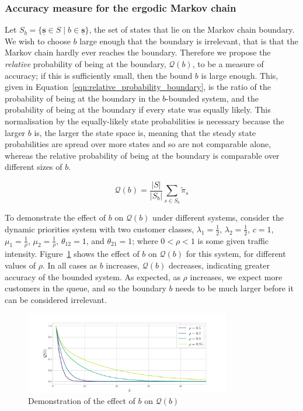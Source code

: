 \documentclass{article}
\begin{document}
\subsubsection{Accuracy measure for the ergodic Markov chain}\label{sec:ergodic_accuracy}
Let $S_b = \{\underline{\mathbf{s}} \in S \;|\; b \in \underline{\mathbf{s}}\}$,
the set of states that lie on the Markov chain boundary. We wish to choose $b$
large enough that the boundary is irrelevant, that is that the Markov chain
hardly ever reaches the boundary. Therefore we propose the \textit{relative}
probability of being at the boundary, $\mathcal{Q}(b)$, to be a measure of
accuracy; if this is sufficiently small, then the bound $b$ is large enough.
This, given in Equation~\ref{eqn:relative_probability_boundary}, is the ratio of
the probability of being at the boundary in the $b$-bounded system, and the
probability of being at the boundary if every state was equally likely. This
normalisation by the equally-likely state probabilities is necessary because the
larger $b$ is, the larger the state space is, meaning that the steady state
probabilities are spread over more states and so are not comparable alone,
whereas the relative probability of being at the boundary is comparable over
different sizes of $b$.

\begin{equation}\label{eqn:relative_probability_boundary}
\mathcal{Q}(b) = \frac{|S|}{|S_b|} \sum_{s \in S_b} \tilde{\pi}_s
\end{equation}

To demonstrate the effect of $b$ on $\mathcal{Q}(b)$ under different systems,
consider the dynamic priorities system with two customer classes,
$\lambda_1 = \frac{1}{2}$, $\lambda_2 = \frac{1}{2}$, $c = 1$,
$\mu_1 = \frac{1}{\rho}$, $\mu_2 = \frac{1}{\rho}$, $\theta_{12} = 1$, and
$\theta_{21} = 1$; where $0 < \rho < 1$ is some given traffic intensity.
Figure~\ref{fig:ergodic_accuracy} shows the effect of $b$ on $\mathcal{Q}(b)$
for this system, for different values of $\rho$. In all cases as $b$ increases,
$\mathcal{Q}(b)$ decreases, indicating greater accuracy of the bounded system.
As expected, as $\rho$ increases, we expect more customers in the queue, and so
the boundary $b$ needs to be much larger before it can be considered irrelevant.

\begin{figure}
  \begin{center}
    \includegraphics[width=0.8\textwidth]{img/quotient_accuracy.pdf}
  \end{center}
  \caption{Demonstration of the effect of $b$ on $\mathcal{Q}(b)$}
  \label{fig:ergodic_accuracy}
\end{figure}
\end{document}

